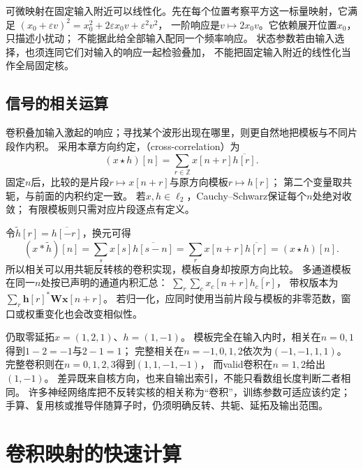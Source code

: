可微映射在固定输入附近可以线性化。先在每个位置考察平方这一标量映射，它满足
$(x_0+\varepsilon v)^2=x_0^2+2\varepsilon x_0v+\varepsilon^2v^2$，
一阶响应是$v\mapsto2x_0v$。它依赖展开位置$x_0$，只描述小扰动；
不能据此给全部输入配同一个频率响应。
状态参数若由输入选择，也须连同它们对输入的响应一起检验叠加，
不能把固定输入附近的线性化当作全局固定核。

\subsection{信号的相关运算}
\label{sec:signal-template-correlation}

卷积叠加输入激起的响应；寻找某个波形出现在哪里，则更自然地把模板与不同片段作内积。
采用本章方向约定，（cross-correlation）为
\begin{equation}
  (x\star h)[n]=\sum_{r\in\mathbb Z}x[n+r]\overline{h[r]}.
  \label{eq:signal-analysis-cross-correlation}
\end{equation}
固定$n$后，比较的是片段$r\mapsto x[n+r]$与原方向模板$r\mapsto h[r]$；
第二个变量取共轭，与前面的内积约定一致。
若$x,h\in\ell_2$，Cauchy--Schwarz保证每个$n$处绝对收敛；
有限模板则只需对应片段逐点有定义。

令$\widetilde h[r]=\overline{h[-r]}$，换元可得
\[
  (x*\widetilde h)[n]=\sum_s x[s]\overline{h[s-n]}
  =\sum_r x[n+r]\overline{h[r]}=(x\star h)[n].
\]
所以相关可以用共轭反转核的卷积实现，模板自身却按原方向比较。
多通道模板在同一$n$处按已声明的通道内积汇总：
$\sum_r\sum_c x_c[n+r]\overline{h_c[r]}$，
带权版本为$\sum_r\bm h[r]^*\bm W\bm x[n+r]$。
若归一化，应同时使用当前片段与模板的非零范数，窗口或权重变化也会改变相似性。

仍取零延拓$x=(1,2,1)$、$h=(1,-1)$。
模板完全在输入内时，相关在$n=0,1$得到$1-2=-1$与$2-1=1$；
完整相关在$n=-1,0,1,2$依次为$(-1,-1,1,1)$。
完整卷积则在$n=0,1,2,3$得到$(1,1,-1,-1)$，
而valid卷积在$n=1,2$给出$(1,-1)$。
差异既来自核方向，也来自输出索引，不能只看数组长度判断二者相同。
许多神经网络库把不反转实核的相关称为“卷积”，训练参数可适应该约定；
手算、复用核或推导伴随算子时，仍须明确反转、共轭、延拓及输出范围。

\section{卷积映射的快速计算}
\label{sec:signal-analysis-fast-transforms}

